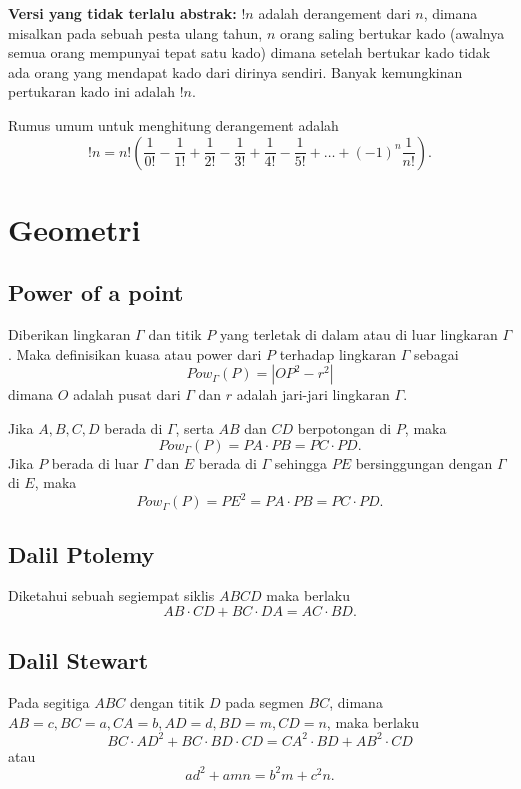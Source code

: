 \documentclass[11pt]{scrartcl}
\begin{document}
    \textbf{Versi yang tidak terlalu abstrak:} $!n$ adalah derangement dari $n$, dimana misalkan pada sebuah pesta ulang tahun, $n$ orang saling bertukar kado (awalnya semua orang mempunyai tepat satu kado) dimana setelah bertukar kado tidak ada orang yang mendapat kado dari dirinya sendiri. Banyak kemungkinan pertukaran kado ini adalah $!n$.
    
    Rumus umum untuk menghitung derangement adalah
    $$!n = n! \left(\dfrac{1}{0!}-\dfrac{1}{1!}+\dfrac{1}{2!}-\dfrac{1}{3!}+\dfrac{1}{4!}-\dfrac{1}{5!}+\dots+(-1)^n\dfrac{1}{n!}\right).$$
    
    
    
    \section{Geometri}
    
    \subsection{Power of a point}
    Diberikan lingkaran $\Gamma$ dan titik $P$ yang terletak di dalam atau di luar lingkaran $\Gamma$. Maka definisikan kuasa atau power dari $P$ terhadap lingkaran $\Gamma$ sebagai
    $$Pow_\Gamma (P) = |OP^2-r^2|$$
    dimana $O$ adalah pusat dari $\Gamma$ dan $r$ adalah jari-jari lingkaran $\Gamma$.
    
    Jika $A,B,C,D$ berada di $\Gamma$, serta $AB$ dan $CD$ berpotongan di $P$, maka $$Pow_\Gamma(P)=PA \cdot PB = PC \cdot PD.$$
    Jika $P$ berada di luar $\Gamma$ dan $E$ berada di $\Gamma$ sehingga $PE$ bersinggungan dengan $\Gamma$ di $E$, maka $$Pow_\Gamma (P) = PE^2 =  PA \cdot PB = PC \cdot PD.$$
    
    \subsection{Dalil Ptolemy}
        Diketahui sebuah segiempat siklis $ABCD$ maka berlaku
        $$AB \cdot CD + BC \cdot DA = AC \cdot BD.$$
        
    \subsection{Dalil Stewart}
        Pada segitiga $ABC$ dengan titik $D$ pada segmen $BC$, dimana $AB=c, BC=a, CA=b, AD=d, BD=m, CD=n$, maka berlaku
        $$BC \cdot AD^2 + BC \cdot BD \cdot CD = CA^2 \cdot BD + AB^2 \cdot CD$$
        atau $$ad^2+amn = b^2m+c^2n.$$
        
\end{document}
